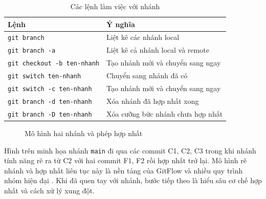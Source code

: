 \begin{table}[H]
\centering
\caption{Các lệnh làm việc với nhánh}
\label{tab:c23-branch-cmd}
\begin{tabular}{ll}
\toprule
Lệnh & Ý nghĩa \\
\midrule
\texttt{git branch} & Liệt kê các nhánh local \\
\texttt{git branch -a} & Liệt kê cả nhánh local và remote \\
\texttt{git checkout -b ten-nhanh} & Tạo nhánh mới và chuyển sang ngay \\
\texttt{git switch ten-nhanh} & Chuyển sang nhánh đã có \\
\texttt{git switch -c ten-nhanh} & Tạo nhánh mới và chuyển sang ngay \\
\texttt{git branch -d ten-nhanh} & Xóa nhánh đã hợp nhất xong \\
\texttt{git branch -D ten-nhanh} & Xóa cưỡng bức nhánh chưa hợp nhất \\
\bottomrule
\end{tabular}
\end{table}

\begin{figure}[H]
\centering
{}
\caption{Mô hình hai nhánh và phép hợp nhất}
\label{fig:c23-branch-merge}
\end{figure}

Hình trên minh họa nhánh \verb|main| đi qua các commit C1, C2, C3 trong khi nhánh tính năng rẽ ra từ C2 với hai commit F1, F2 rồi hợp nhất trở lại. Mô hình rẽ nhánh và hợp nhất liên tục này là nền tảng của GitFlow và nhiều quy trình nhóm hiện đại \cite{gitflow}. Khi đã quen tay với nhánh, bước tiếp theo là hiểu sâu cơ chế hợp nhất và cách xử lý xung đột.

